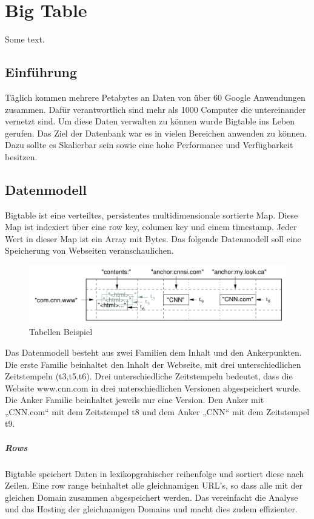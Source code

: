 \chapter{Big Table}
\label{bigTable}
Some text.

\section{Einführung}
Täglich kommen mehrere Petabytes an Daten von über 60 Google Anwendungen zusammen. Dafür verantwortlich sind mehr als 1000 Computer die untereinander vernetzt sind. Um diese Daten verwalten zu können wurde Bigtable ins Leben gerufen. Das Ziel der Datenbank war es in vielen Bereichen anwenden zu können. Dazu sollte es Skalierbar sein sowie eine hohe Performance und Verfügbarkeit besitzen.


\section{Datenmodell}
Bigtable ist eine verteiltes, persistentes multidimensionale sortierte Map. Diese Map ist indexiert über eine row key, columen key und einem timestamp. Jeder Wert in dieser Map ist ein Array mit Bytes. Das folgende Datenmodell soll eine Speicherung von Webseiten veranschaulichen.

\begin{figure}[!htpb]
	\centering
	\includegraphics[]{pics/bigtable_schema.png}
	\caption {Tabellen Beispiel}	
\end{figure}

Das Datenmodell besteht aus zwei Familien dem Inhalt und den Ankerpunkten. Die erste Familie beinhaltet den Inhalt der Webseite, mit drei unterschiedlichen Zeitstempeln (t3,t5,t6). Drei unterschiedliche Zeitstempeln bedeutet, dass die Website www.cnn.com in drei unterschiedlichen Versionen abgespeichert wurde. Die Anker Familie beinhaltet jeweils nur eine Version. Den Anker mit „CNN.com“ mit dem Zeitstempel t8 und dem Anker „CNN“ mit dem Zeitstempel t9. 
 
\paragraph{Rows}
Bigtable speichert Daten in lexikopgrahischer reihenfolge und sortiert diese nach Zeilen. Eine row range beinhaltet alle gleichnamigen URL’s, so dass alle mit der gleichen Domain zusammen abgespeichert werden. Das vereinfacht die Analyse und das Hosting der gleichnamigen Domains und macht dies zudem effizienter.

